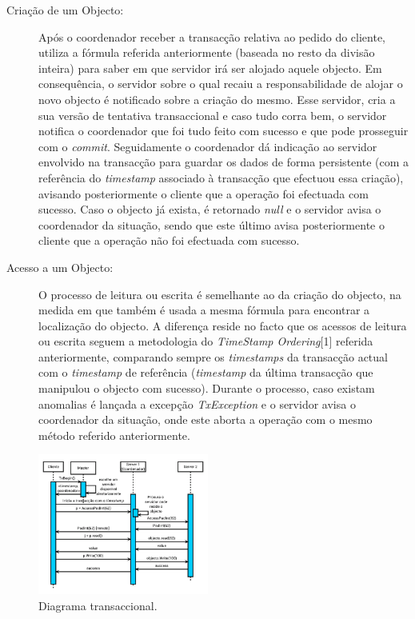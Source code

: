 \begin{description}
\item[Criação de um Objecto:] Após o coordenador receber a transacção relativa ao pedido do cliente, utiliza a fórmula referida anteriormente (baseada no resto da divisão inteira) para saber em que servidor irá ser alojado aquele objecto. Em consequência, o servidor sobre o qual recaiu a responsabilidade de alojar o novo objecto é notificado sobre a criação do mesmo. Esse servidor, cria a sua versão de tentativa transaccional e caso tudo corra bem, o servidor notifica o coordenador que foi tudo feito com sucesso e que pode prosseguir com o \textit{commit}. Seguidamente o coordenador dá indicação ao servidor envolvido na transacção para guardar os dados de forma persistente (com a referência do \textit{timestamp} associado à transacção que efectuou essa criação), avisando posteriormente o cliente que a operação foi efectuada com sucesso. Caso o objecto já exista, é retornado \textit{null} e o servidor avisa o coordenador da situação, sendo que este último avisa posteriormente o cliente que a operação não foi efectuada com sucesso.

\item[Acesso a um Objecto:] O processo de leitura ou escrita é semelhante ao da criação do objecto, na medida em que também é usada a mesma fórmula para encontrar a localização do objecto. A diferença reside no facto que os acessos de leitura ou escrita seguem a metodologia do \textit{TimeStamp Ordering}[1] referida anteriormente, comparando sempre os \textit{timestamps} da transacção actual com o \textit{timestamp} de referência (\textit{timestamp} da última transacção que manipulou o objecto com sucesso). Durante o processo, caso existam anomalias é lançada a excepção \textit{TxException} e o servidor avisa o coordenador da situação, onde este aborta a operação com o mesmo método referido anteriormente.
\end{description}

\begin{figure}
\centering
\includegraphics[width=0.5\textwidth]{transaccao.png}
\caption{\label{fig:transaccao}Diagrama transaccional.}
\end{figure}